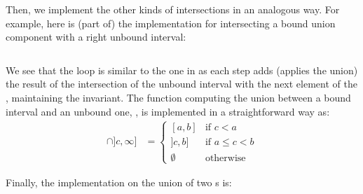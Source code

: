 Then, we implement the other kinds of intersections in an analogous way. For example,
here is (part of) the implementation for intersecting a bound union component with a right
unbound interval:
%
\inputminted{\whyml}{why3code/inter_up_bound.mlw}
%
We see that the loop is similar to the one in  as each step adds
(applies the union) the result of the intersection of the unbound interval with the
next element of the , maintaining the invariant.
%
The function computing the union between a bound interval and an unbound one,
, is implemented in a straightforward way as:
%
\begin{align*}
  [a, b] \cap ]c, \infty] &=
  \begin{cases}
    [a, b]  & \text{if } c < a \\
    ]c, b]  & \text{if } a \le c < b \\
    \emptyset & \text{otherwise}
  \end{cases}
\end{align*}

Finally, the implementation on the union of two s is:
\inputminted{\whyml}{why3code/inter.mlw}


